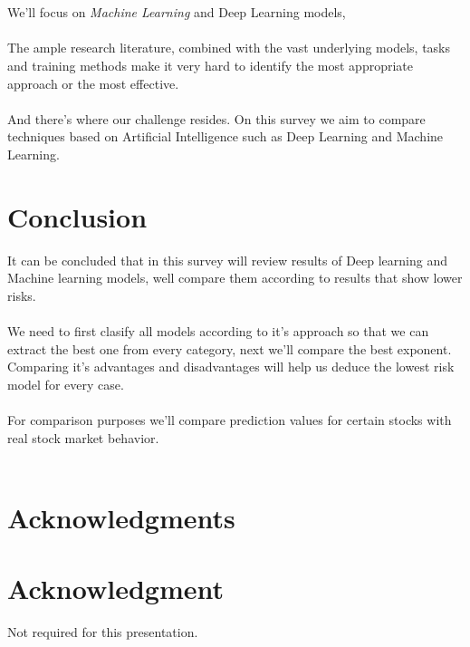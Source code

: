 \documentclass[conference]{IEEEtran}
\begin{document}
\\\\
We'll focus on \textit{Machine Learning} and Deep Learning models,
\\\\
The ample research literature, combined with the vast underlying models, tasks and training methods make it very
hard to identify the most appropriate approach or the most effective.
\\\\
And there's where our challenge resides. On this survey we aim to compare techniques based on Artificial Intelligence such as Deep Learning and Machine Learning.

\section{Conclusion}
It can be concluded that in this survey will review results of Deep learning and Machine learning models, 
well compare them according to results that show lower risks.
\\\\
We need to first clasify all models according to it's approach so that we can extract the best one from every
category, next we'll compare the best exponent. Comparing it's advantages and disadvantages will help us deduce
the lowest risk model for every case.
\\\\
For comparison purposes we'll compare prediction values for certain stocks with real stock market behavior.
\\\\
\ifCLASSOPTIONcompsoc
  \section*{Acknowledgments}
\else
  \section*{Acknowledgment}
\fi
Not required for this presentation.



\end{document}

